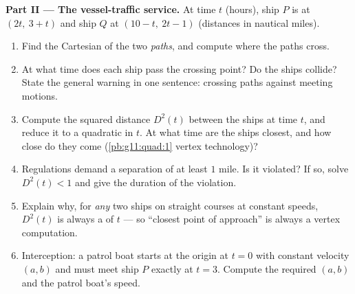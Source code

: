 \begin{problem}
\medskip
\noindent\textbf{Part II --- The vessel-traffic service.}
At time $t$ (hours), ship $P$ is at $(2t,\ 3 + t)$ and ship $Q$
at $(10 - t,\ 2t - 1)$ (distances in nautical miles).
\begin{enumerate}[resume]
  \item Find the Cartesian  of the two \emph{paths},
        and compute where the paths cross.
  \item At what time does each ship pass the crossing point? Do
        the ships collide? State the general warning in one
        sentence: crossing paths against meeting motions.
  \item Compute the squared distance $D^2(t)$ between the ships
        at time $t$, and reduce it to a quadratic in $t$. At
        what time are the ships closest, and how close do they
        come (\cref{pb:g11:quad:1} vertex technology)?
  \item Regulations demand a separation of at least $1$ mile.
        Is it violated? If so, solve $D^2(t) < 1$ and give the
        duration of the violation.
  \item Explain why, for \emph{any} two ships on straight
        courses at constant speeds, $D^2(t)$ is always a
         of $t$ --- so ``closest point of
        approach'' is always a vertex computation.
  \item Interception: a patrol boat starts at the origin at
        $t = 0$ with constant velocity $(a, b)$ and must meet
        ship $P$ exactly at $t = 3$. Compute the required
        $(a, b)$ and the patrol boat's speed.
\end{enumerate}


\end{problem}
